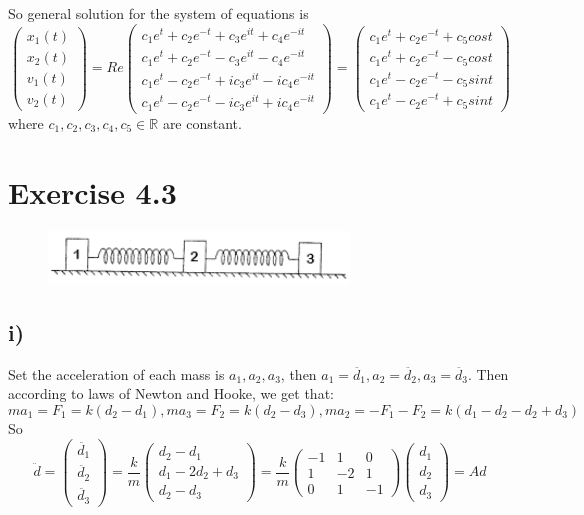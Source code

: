 \documentclass[a4paper,12pt,titlepage]{article}
\begin{document}
So general solution for the system of equations is
$$\begin{pmatrix}
x_1(t)\\
x_2(t)\\
v_1(t)\\
v_2(t)
\end{pmatrix}=Re\begin{pmatrix}
c_1e^t+c_2e^{-t}+c_3e^{it}+c_4e^{-it}\\
c_1e^t+c_2e^{-t}-c_3e^{it}-c_4e^{-it}\\
c_1e^t-c_2e^{-t}+ic_3e^{it}-ic_4e^{-it}\\
c_1e^t-c_2e^{-t}-ic_3e^{it}+ic_4e^{-it}
\end{pmatrix}=\begin{pmatrix}
c_1e^t+c_2e^{-t}+c_5cost\\
c_1e^t+c_2e^{-t}-c_5cost\\
c_1e^t-c_2e^{-t}-c_5sint\\
c_1e^t-c_2e^{-t}+c_5sint
\end{pmatrix}$$
where $c_1,c_2,c_3,c_4,c_5\in\mathbb{R}$ are constant.

\section*{Exercise 4.3}

\begin{figure}[H]
    \centering
    \includegraphics[width=8cm]{1.png}
\end{figure}
\subsection*{i)}
Set the acceleration of each mass is $a_1,a_2,a_3$, then $a_1=\ddot{d_1},a_2=\ddot{d_2},a_3=\ddot{d_3}$. Then according to laws of Newton and Hooke, we get that:
$$ma_1=F_1=k(d_2-d_1),ma_3=F_2=k(d_2-d_3),ma_2=-F_1-F_2=k(d_1-d_2-d_2+d_3) $$
So
$$\ddot{d}=\begin{pmatrix}
\ddot{d_1}\\
\ddot{d_2}\\
\ddot{d_3}
\end{pmatrix}=\dfrac{k}{m}\begin{pmatrix}
d_2-d_1\\
d_1-2d_2+d_3\\
d_2-d_3
\end{pmatrix}=\dfrac{k}{m}\begin{pmatrix}
-1&1&0\\
1&-2&1\\
0&1&-1
\end{pmatrix}\begin{pmatrix}
d_1\\
d_2\\
d_3
\end{pmatrix}=Ad$$
\end{document}
